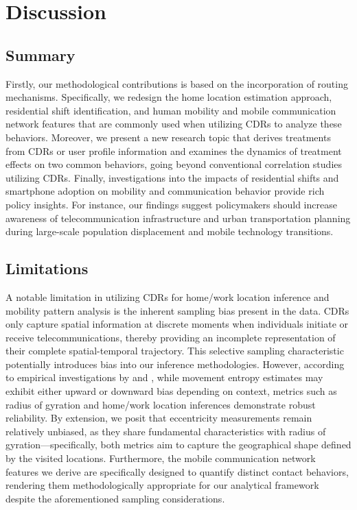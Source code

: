 
\chapter{Discussion}
\section{Summary}
Firstly, our methodological contributions is based on the incorporation of routing mechanisms.
Specifically, we redesign the home location estimation approach, residential shift identification, and human mobility and mobile communication network features that are commonly used when utilizing CDRs to analyze these behaviors. Moreover, we present a new research topic that derives treatments from CDRs or user profile information and examines the dynamics of treatment effects on two common behaviors, going beyond conventional correlation studies utilizing CDRs.
Finally, investigations into the impacts of residential shifts and smartphone adoption on mobility and communication behavior provide rich policy insights. For instance, our findings suggest policymakers should increase awareness of telecommunication infrastructure and urban transportation planning during large-scale population displacement and mobile technology transitions.


\section{Limitations}
A notable limitation in utilizing CDRs for home/work location inference and mobility pattern analysis is the inherent sampling bias present in the data.
CDRs only capture spatial information at discrete moments when individuals initiate or receive telecommunications, thereby providing an incomplete representation of their complete spatial-temporal trajectory.
This selective sampling characteristic potentially introduces bias into our inference methodologies.
However, according to empirical investigations by \cite{ranjan2012call} and \cite{zhao2016understanding}, while movement entropy estimates may exhibit either upward or downward bias depending on context, metrics such as radius of gyration and home/work location inferences demonstrate robust reliability.
By extension, we posit that eccentricity measurements remain relatively unbiased, as they share fundamental characteristics with radius of gyration—specifically, both metrics aim to capture the geographical shape defined by the visited locations.
Furthermore, the mobile communication network features we derive are specifically designed to quantify distinct contact behaviors, rendering them methodologically appropriate for our analytical framework despite the aforementioned sampling considerations.

